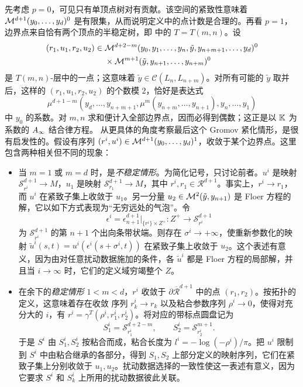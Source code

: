 先考虑 $p=0$，可见只有单顶点树对有贡献。该空间的紧致性意味着 $\mathcal M^{d+1}(y_0,\ldots,y_d)^0$ 是有限集，从而说明定义中的点计数是合理的。再看 $p=1$，边界点来自恰有两个顶点的半稳定树，即 中的 $T=T(m,n)$。设
\begin{equation}\label{eq:9.30}
\begin{aligned}
(r_1,u_1,r_2,u_2)\in{}&\mathcal M^{d+2-m}(y_0,y_1,\ldots,y_n,\tilde y,y_{n+m+1},\ldots,y_d)^0\\
&\times\mathcal M^{m+1}(\tilde y,y_{n+1},\ldots,y_{n+m})^0
\end{aligned}
\end{equation}
是 $T(m,n)$-层中的一点；这意味着 $\tilde y\in\mathcal C(L_n,L_{n+m})$。对所有可能的 $\tilde y$ 取并后，这样的 $(r_1,u_1,r_2,u_2)$ 的个数模 $2$，恰好是表达式
\[
\mu^{d+1-m}(y_d,\ldots,y_{n+m+1},\mu^m(y_{n+m},\ldots,y_{n+1}),y_n,\ldots,y_1)
\]
中 $y_0$ 的系数。对 $m,n$ 求和便计入全部边界点，因而必得到偶数；这正是以 $\mathbb K$ 为系数的 $A_\infty$ 结合律方程。
从更具体的角度考察最后这个 Gromov 紧化情形，是很有启发性的。假设有序列 $(r^i,u^i)\in\mathcal M^{d+1}(y_0,\ldots,y_d)^1$，收敛于某个边界点。这里包含两种相关但不同的现象：
\begin{itemize}
\item 当 $m=1$ 或 $m=d$ 时，是\emph{不稳定情形}。为简化记号，只讨论前者。$u^i$ 是映射 $\mathcal S_{r^i}^{d+1}\to M$，$u_1$ 是映射 $\mathcal S_{r_1}^{d+1}\to M$，其中 $r^i,r_1\in\mathcal R^{d+1}$。事实上，$r^i\to r_1$，而 $u^i$ 在紧致子集上收敛于 $u_1$。另一分量 $u_2\in\mathcal M^2(\tilde y,y_{n+1})$ 是 Floer 方程的解，它以如下方式表现为“无穷远处的气泡”。令
\[
\epsilon^i=\epsilon_{n+1}^{d+1}|_{\{r^i\}\times Z^+}:Z^+\longrightarrow\mathcal S_{r^i}^{d+1}
\]
为 $\mathcal S_{r^i}^{d+1}$ 的第 $n+1$ 个出向条带状端。则存在 $\sigma^i\to+\infty$，使重新参数化的映射 $\tilde u^i(s,t)=u^i(\epsilon^i(s+\sigma^i,t))$ 在紧致子集上收敛于 $u_2$。这个表述有意义，因为由对任意扰动数据施加的条件，各 $\tilde u^i$ 都是 Floer 方程的局部解，并且当 $i\to\infty$ 时，它们的定义域穷竭整个 $Z$。
\item 在余下的\emph{稳定情形} $1<m<d$，$r^i$ 收敛于 $\partial\overline{\mathcal R}^{d+1}$ 中的点 $(r_1,r_2)$。按拓扑的定义，这意味着存在收敛
序列 $r_k^i\to r_k$ 以及粘合参数序列 $\rho^i\to0$，使得对充分大的 $i$，有 $r^i=\gamma^T(\rho^i,r_1^i,r_2^i)$。将对应的带标点圆盘记为
\[
S_1^i=\mathcal S_{r_1^i}^{d+2-m},\qquad S_2^i=\mathcal S_{r_2^i}^{m+1}.
\]
于是 $S^i$ 由 $S_1^i,S_2^i$ 按粘合而成，粘合长度为 $l^i=-\log(-\rho^i)/\pi$。把 $u^i$ 限制到 $S^i$ 中由粘合继承的各部分，得到 $S_1,S_2$ 上部分定义的映射序列，它们在紧致子集上分别收敛于 $u_1,u_2$。扰动数据选择的一致性使这一表述有意义，因为它要求 $S^i$ 和 $S_k^i$ 上所用的扰动数据彼此关联。
\end{itemize}

